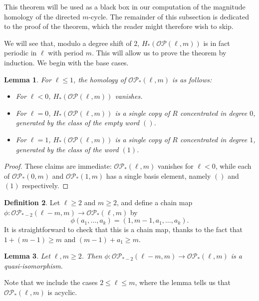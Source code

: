 \documentclass[a4paper, 11 pt, oneside, reqno]{amsart}
\newtheorem{lemma}{Lemma}
\numberwithin{lemma}{section}
\theoremstyle{definition}
\newtheorem{definition}[lemma]{Definition}
\newcommand{\OP}{\mathcal{OP}}
\begin{document}
This theorem will be used as a black box in our computation
of the magnitude homology of the directed $m$-cycle.
The remainder of this subsection is dedicated to the proof
of the theorem, which the reader might therefore wish to skip.

We will see that, modulo a degree shift of $2$,
$H_\ast(\OP(\ell,m))$ is in fact periodic in $\ell$ 
with period $m$.
This will allow us to prove the theorem by induction.
We begin with the base cases.

\begin{lemma}\label{OP-base-cases}
    For $\ell\leq 1$, the homology of 
    $\OP_\ast(\ell,m)$ is as follows:
    \begin{itemize}
        \item
        For $\ell<0$, $H_\ast(\OP(\ell,m))$
        vanishes.
        \item
        For $\ell=0$, $H_\ast(\OP(\ell,m))$ 
        is a single copy of $R$ concentrated
        in degree $0$, generated by the class of the
        empty word $()$.
        \item
        For $\ell=1$, $H_\ast(\OP(\ell,m))$
        is a single copy of $R$ concentrated in degree
        $1$, generated by the class of the word $(1)$.
    \end{itemize}
\end{lemma}

\begin{proof}
    These claims are immediate: $\OP_\ast(\ell,m)$
    vanishes for $\ell<0$, while each of $\OP_\ast(0,m)$
    and $\OP_\ast(1,m)$ has a single basis element,
    namely $()$ and $(1)$ respectively.
\end{proof}

\begin{definition}
    Let $\ell\geq 2$ and $m\geq 2$, and  define a chain map 
    $\phi\colon\OP_{\ast-2}(\ell-m,m)\to\OP_{\ast}(\ell,m)$
    by 
    \[
        \phi(a_1,\ldots,a_k)
        =
        (1,m-1,a_1,\ldots,a_k).
    \]
    It is straightforward to check that this is a chain map,
    thanks to the fact that $1+(m-1)\geq m$ and
    $(m-1)+a_1\geq m$.
\end{definition}


\begin{lemma}\label{OP-step}
    Let $\ell,m\geq 2$.
    Then $\phi\colon\OP_{\ast-2}(\ell-m,m)\to\OP_{\ast}(\ell,m)$ 
    is a quasi-isomorphism.
\end{lemma}

Note that we include the cases $2\leq\ell\leq m$,
where the lemma tells us that $\OP_\ast(\ell,m)$
is acyclic.
\end{document}
